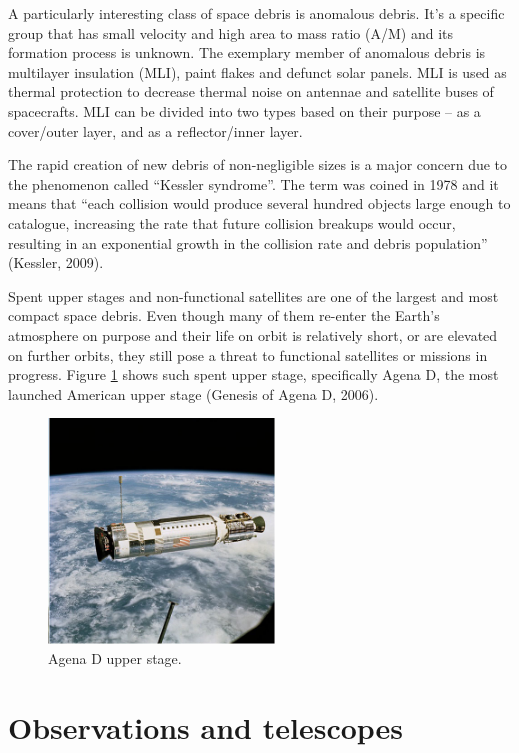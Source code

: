 	A particularly interesting class of space debris is anomalous debris. It's a specific group that has small velocity and high area to mass ratio (A/M) and its formation process is unknown. The exemplary member of anomalous debris is multilayer insulation (MLI),  paint flakes and defunct solar panels. MLI is used as thermal protection to decrease thermal noise on antennae and satellite buses of spacecrafts. MLI can be divided into two types based on their purpose – as a cover/outer layer, and as a reflector/inner layer.
	
	The rapid creation of new debris of non-negligible sizes is a major concern due to the phenomenon called “Kessler syndrome”. The term was coined in 1978 and it means that “each collision would produce several hundred objects large enough to catalogue, increasing the rate that future collision breakups would occur, resulting in an exponential growth in the collision rate and debris population” (Kessler, 2009).
	
	Spent upper stages and non-functional satellites are one of the largest and most compact space debris. Even though many of them re-enter the Earth's atmosphere on purpose and their life on orbit is relatively short, or are elevated on further orbits, they still pose a threat to functional satellites or missions in progress. Figure \ref{fig:upperstage} shows such spent upper stage, specifically Agena D, the most launched American upper stage (Genesis of Agena D, 2006).
	
\begin{figure}[H]
\centering
  \includegraphics[width=6cm]{images/upperstage}
  \caption{Agena D upper stage.}
  \label{fig:upperstage}
\end{figure}
	
\pagebreak


\section{Observations and telescopes}\label{sec:observations_telescopes}

